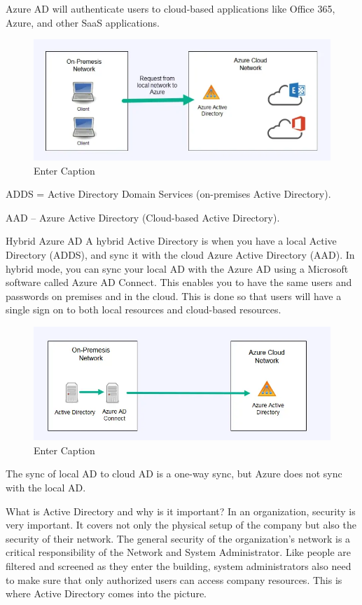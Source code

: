 Azure AD will authenticate users to cloud-based applications like Office 365, Azure, and other SaaS applications.

\begin{figure}
    \centering
    \includegraphics[width=0.75\linewidth]{aad.png}
    \caption{Enter Caption}
    \label{fig:placeholder}
\end{figure}

ADDS = Active Directory Domain Services (on-premises Active Directory).

AAD – Azure Active Directory (Cloud-based Active Directory).

Hybrid Azure AD
A hybrid Active Directory is when you have a local Active Directory (ADDS), and sync it with the cloud Azure Active Directory (AAD). In hybrid mode, you can sync your local AD with the Azure AD using a Microsoft software called Azure AD Connect. This enables you to have the same users and passwords on premises and in the cloud. This is done so that users will have a single sign on to both local resources and cloud-based resources.

\begin{figure}
    \centering
    \includegraphics[width=0.75\linewidth]{aadcloud.png}
    \caption{Enter Caption}
    \label{fig:placeholder}
\end{figure}

The sync of local AD to cloud AD is a one-way sync, but Azure does not sync with the local AD.

What is Active Directory and why is it important?
In an organization, security is very important. It covers not only the physical setup of the company but also the security of their network. The general security of the organization’s network is a critical responsibility of the Network and System Administrator. Like people are filtered and screened as they enter the building, system administrators also need to make sure that only authorized users can access company resources. This is where Active Directory comes into the picture. 

